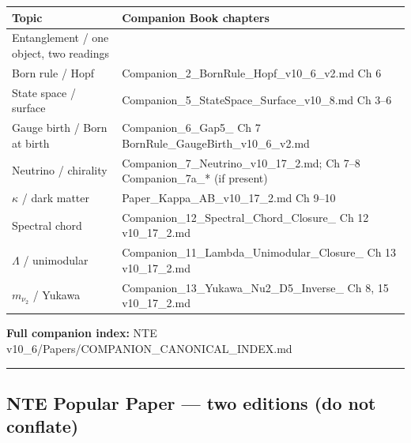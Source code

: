\documentclass[
  11pt,
]{article}
\newcounter{none} %
\begin{document}
{\def\LTcaptype{none} %
\begin{longtable}[]{@{}
  >{\raggedright\arraybackslash}p{}
  >{\raggedright\arraybackslash}p{}@{}}
\toprule\noalign{}
\begin{minipage}[b]{\linewidth}\raggedright
Topic
\end{minipage} & \begin{minipage}[b]{\linewidth}\raggedright
Companion \textbar{} Book chapters
\end{minipage} \\
\midrule\noalign{}
\endhead
\bottomrule\noalign{}
\endlastfoot
Entanglement / one object, two readings & \\
Born rule / Hopf & Companion\_2\_BornRule\_Hopf\_v10\_6\_v2.md
\textbar{} Ch 6 \\
State space / surface & Companion\_5\_StateSpace\_Surface\_v10\_8.md
\textbar{} Ch 3--6 \\
Gauge birth / Born at birth & Companion\_6\_Gap5\_ \textbar{} Ch 7
\textbar{} BornRule\_GaugeBirth\_v10\_6\_v2.md \textbar{} \\
Neutrino / chirality & Companion\_7\_Neutrino\_v10\_17\_2.md; \textbar{}
Ch 7--8 Companion\_7a\_* (if present) \textbar{} \\
\(\kappa\) / dark matter & Paper\_Kappa\_AB\_v10\_17\_2.md \textbar{} Ch
9--10 \\
Spectral chord & Companion\_12\_Spectral\_Chord\_Closure\_ \textbar{} Ch
12 \textbar{} v10\_17\_2.md \textbar{} \\
\(\Lambda\) / unimodular & Companion\_11\_Lambda\_Unimodular\_Closure\_
\textbar{} Ch 13 v10\_17\_2.md \textbar{} \\
\(m_{\nu_2}\) / Yukawa & Companion\_13\_Yukawa\_Nu2\_D5\_Inverse\_
\textbar{} Ch 8, 15 v10\_17\_2.md \textbar{} \\
\end{longtable}
}

\textbf{Full companion index:} NTE
v10\_6/Papers/COMPANION\_CANONICAL\_INDEX.md

\begin{center}\rule{0.5\linewidth}{0.5pt}\end{center}

\subsection{NTE Popular Paper --- two editions (do not
conflate)}\label{nte-popular-paper-two-editions-do-not-conflate}
\end{document}
